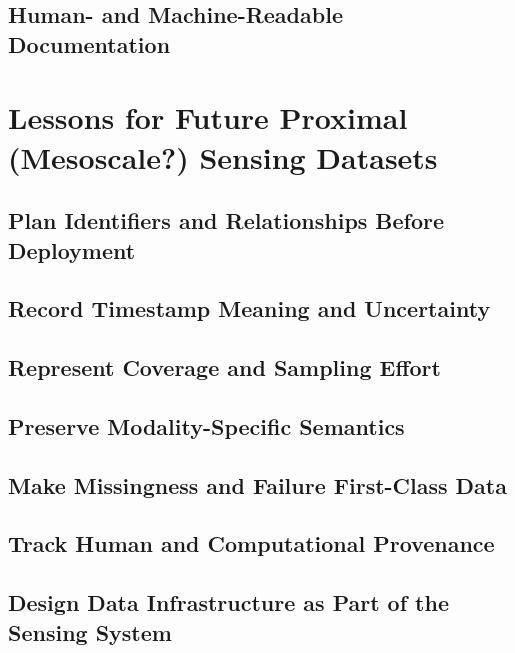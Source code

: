 \documentclass[manuscript]{acmart}
\begin{document}
\subsection{Human- and Machine-Readable Documentation}

\newpage
\section{Lessons for Future Proximal (Mesoscale?) Sensing Datasets}
\label{sec:lessons}

\subsection{Plan Identifiers and Relationships Before Deployment}

\subsection{Record Timestamp Meaning and Uncertainty}

\subsection{Represent Coverage and Sampling Effort}

\subsection{Preserve Modality-Specific Semantics}

\subsection{Make Missingness and Failure First-Class Data}

\subsection{Track Human and Computational Provenance}

\subsection{Design Data Infrastructure as Part of the Sensing System}

\newpage
\end{document}
